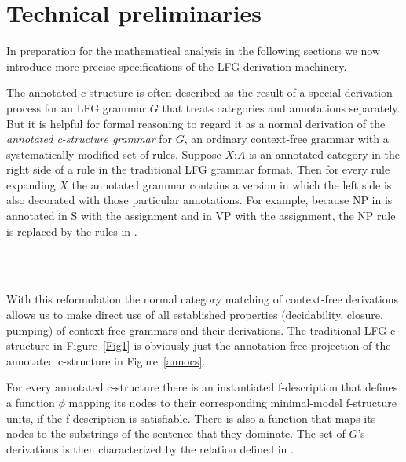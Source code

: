 \documentclass[output=paper,hidelinks]{langscibook}
\begin{document}
\section{Technical preliminaries}
In preparation for the mathematical analysis in the following sections we now introduce more precise specifications of the LFG derivation machinery.

The annotated c-structure is often described as the result of a special derivation process for an LFG grammar $G$ that treats categories and annotations separately.  But it is helpful for formal reasoning to regard it as a normal derivation of the \textit{annotated c-structure grammar} for $G$, an ordinary context-free grammar with a systematically modified set of rules.  Suppose $X$:$A$ is an annotated category in the right side of a rule in the traditional LFG grammar format.  Then for every rule expanding $X$ the annotated grammar contains a version in which the left side is also decorated with those particular annotations.  For example, because NP in  is annotated in S with the  assignment and in VP with the  assignment, the NP rule is replaced by the rules in .

\ea\label{annoNP}\small
{} \hsp{-1em}\rarrow\    \\[1em]
 \hsp{-1.1em}\rarrow\   
\z

\noindent With this reformulation the normal category matching of context-free derivations allows us to make direct use of all established properties (decidability, closure, pumping) of context-free grammars and their derivations.  The traditional LFG c-structure in Figure~\ref{Fig1} is obviously just the annotation-free projection of the annotated c-structure in Figure~\ref{annocs}.

For every annotated c-structure there is an instantiated f-description that defines a function $\phi$ mapping its nodes to their corresponding minimal-model f-structure units, if the f-description is satisfiable.    There is also a function \Yield that maps its nodes to the substrings of the sentence that they dominate.  The set of $G$'s derivations is then characterized by the relation  defined in .
\end{document}

